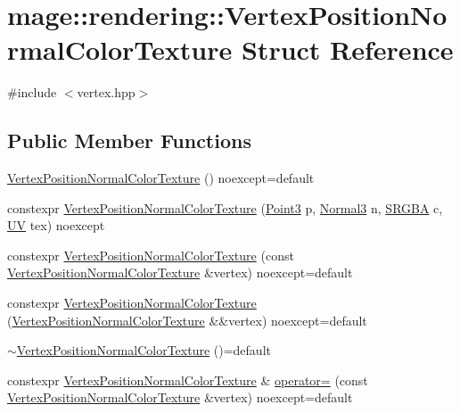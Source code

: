 \hypertarget{structmage_1_1rendering_1_1_vertex_position_normal_color_texture}{}\section{mage\+:\+:rendering\+:\+:Vertex\+Position\+Normal\+Color\+Texture Struct Reference}
\label{structmage_1_1rendering_1_1_vertex_position_normal_color_texture}


{\ttfamily \#include $<$vertex.\+hpp$>$}

\subsection*{Public Member Functions}
\begin{DoxyCompactItemize}
\item 
\hyperlink{structmage_1_1rendering_1_1_vertex_position_normal_color_texture_a9655643724642a5d4a3f5baf85340412}{Vertex\+Position\+Normal\+Color\+Texture} () noexcept=default
\item 
constexpr \hyperlink{structmage_1_1rendering_1_1_vertex_position_normal_color_texture_aab0752efecf2ab896a9425eb117495ce}{Vertex\+Position\+Normal\+Color\+Texture} (\hyperlink{structmage_1_1_point3}{Point3} p, \hyperlink{structmage_1_1_normal3}{Normal3} n, \hyperlink{structmage_1_1_s_r_g_b_a}{S\+R\+G\+BA} c, \hyperlink{structmage_1_1_u_v}{UV} tex) noexcept
\item 
constexpr \hyperlink{structmage_1_1rendering_1_1_vertex_position_normal_color_texture_a2794448eab99a93dc310ccd35359286d}{Vertex\+Position\+Normal\+Color\+Texture} (const \hyperlink{structmage_1_1rendering_1_1_vertex_position_normal_color_texture}{Vertex\+Position\+Normal\+Color\+Texture} \&vertex) noexcept=default
\item 
constexpr \hyperlink{structmage_1_1rendering_1_1_vertex_position_normal_color_texture_a78fbb9ec2a5c4b26ab789c966ba89e64}{Vertex\+Position\+Normal\+Color\+Texture} (\hyperlink{structmage_1_1rendering_1_1_vertex_position_normal_color_texture}{Vertex\+Position\+Normal\+Color\+Texture} \&\&vertex) noexcept=default
\item 
\hyperlink{structmage_1_1rendering_1_1_vertex_position_normal_color_texture_ac209c1c9239db1545c0c9920d6560b1d}{$\sim$\+Vertex\+Position\+Normal\+Color\+Texture} ()=default
\item 
constexpr \hyperlink{structmage_1_1rendering_1_1_vertex_position_normal_color_texture}{Vertex\+Position\+Normal\+Color\+Texture} \& \hyperlink{structmage_1_1rendering_1_1_vertex_position_normal_color_texture_a79367a6d31a3d70603b216dc22459756}{operator=} (const \hyperlink{structmage_1_1rendering_1_1_vertex_position_normal_color_texture}{Vertex\+Position\+Normal\+Color\+Texture} \&vertex) noexcept=default

\end{DoxyCompactItemize}
